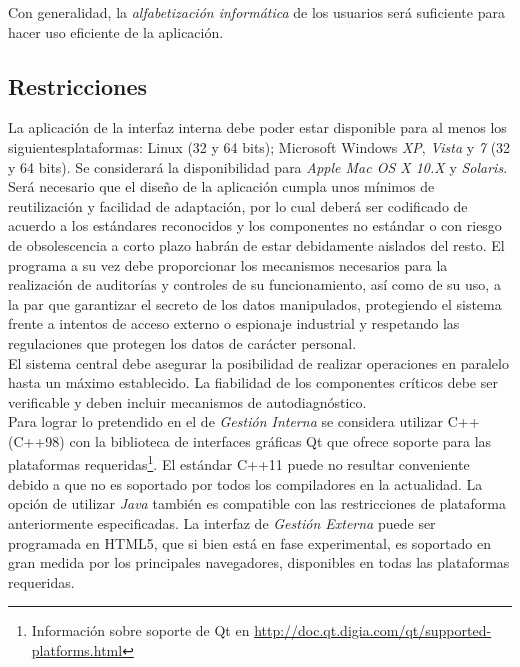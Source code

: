 \documentclass[11pt, a4paper, twoside, titlepage]{article}
\begin{document}
			Con generalidad, la \textit{alfabetización informática} de los usuarios será suficiente para hacer uso eficiente de la aplicación.

		\subsection{Restricciones}

			La aplicación de la interfaz interna debe poder estar disponible para al menos los siguientes\break plataformas: \gls{Linux} (32 y 64 bits); \gls{Microsoft Windows} \textit{XP},  \textit{Vista} y \textit{7} (32 y 64 bits). Se considerará la disponibilidad para \textit{Apple Mac OS X 10.X} y \textit{Solaris}. Será necesario que el diseño de la aplicación cumpla unos mínimos de reutilización y facilidad de adaptación, por lo cual deberá ser codificado de acuerdo a los estándares reconocidos y los componentes no estándar o con riesgo de obsolescencia a corto plazo habrán de estar debidamente aislados del resto. El programa a su vez debe proporcionar los mecanismos necesarios para la realización de auditorías y controles de su funcionamiento, así como de su uso, a la par que garantizar el secreto de los datos manipulados, protegiendo el sistema frente a intentos de acceso externo o espionaje industrial y respetando las regulaciones que protegen los datos de carácter personal.\\

			El sistema \software central debe asegurar la posibilidad de realizar operaciones en paralelo hasta un máximo establecido. La fiabilidad de los componentes críticos debe ser verificable y deben incluir mecanismos de autodiagnóstico.\\

			Para lograr lo pretendido en el \software de \textit{Gestión Interna} se considera utilizar \gls{C++} (C++98) con la biblioteca de interfaces gráficas \gls{Qt} que ofrece soporte para las plataformas requeridas\footnote{Información sobre soporte de Qt en \url{http://doc.qt.digia.com/qt/supported-platforms.html}}. El estándar C++11 puede no resultar conveniente debido a que no es soportado por todos los compiladores en la actualidad. La opción de utilizar \textit{Java} también es compatible con las restricciones de plataforma anteriormente especificadas. La interfaz de \textit{Gestión Externa} puede ser programada en \gls{HTML5}, que si bien está en fase experimental, es soportado en gran medida por los principales navegadores, disponibles en todas las plataformas requeridas.
\end{document}
